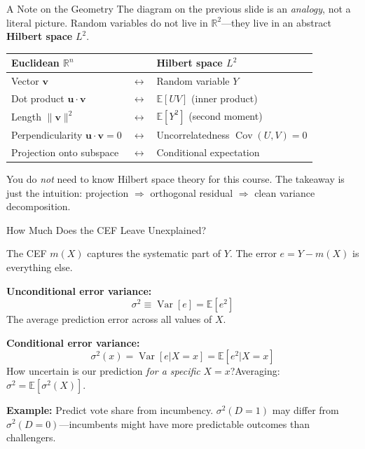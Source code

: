 \documentclass[aspectratio=169]{beamer}
\numberwithin{equation}{section}
\begin{document}
\begin{frame}{A Note on the Geometry}
The diagram on the previous slide is an \emph{analogy}, not a literal picture.  Random variables do not live in $\mathbb{R}^2$---they live in an abstract \textbf{Hilbert space} $L^2$.

\medskip
\begin{center}
\begin{tabular}{lll}
\toprule
\textbf{Euclidean $\mathbb{R}^n$} & & \textbf{Hilbert space $L^2$}\\
\midrule
Vector $\mathbf{v}$ & $\longleftrightarrow$ & Random variable $Y$\\
Dot product $\mathbf{u}\cdot\mathbf{v}$ & $\longleftrightarrow$ & $\mathbb{E}[UV]$ (inner product)\\
Length $\|\mathbf{v}\|^2$ & $\longleftrightarrow$ & $\mathbb{E}[Y^2]$ (second moment)\\
Perpendicularity $\mathbf{u}\cdot\mathbf{v}=0$ & $\longleftrightarrow$ & Uncorrelatedness $\operatorname{Cov}(U,V)=0$\\
Projection onto subspace & $\longleftrightarrow$ & Conditional expectation\\
\bottomrule
\end{tabular}
\end{center}

\medskip\pause
You do \emph{not} need to know Hilbert space theory for this course.  The takeaway is just the intuition: \alert{projection $\Rightarrow$ orthogonal residual $\Rightarrow$ clean variance decomposition}.
\end{frame}


\begin{frame}{How Much Does the CEF Leave Unexplained?}

The CEF $m(X)$ captures the systematic part of $Y$.  The error $e = Y - m(X)$ is everything else.

\medskip
\textbf{Unconditional error variance:}
$$\sigma^2 \equiv \operatorname{Var}[e]=\mathbb{E}[e^2]$$
The average prediction error across all values of $X$.

\medskip\pause
\textbf{Conditional error variance:}
$$\sigma^2(x)=\operatorname{Var}[e|X=x]=\mathbb{E}[e^2|X=x]$$
How uncertain is our prediction \emph{for a specific} $X=x$?\quad Averaging: $\sigma^2=\mathbb{E}[\sigma^2(X)]$.

\medskip\pause
\textbf{Example:} Predict vote share from incumbency.  $\sigma^2(D{=}1)$ may differ from $\sigma^2(D{=}0)$---incumbents might have more predictable outcomes than challengers.
\end{frame}
\end{document}

